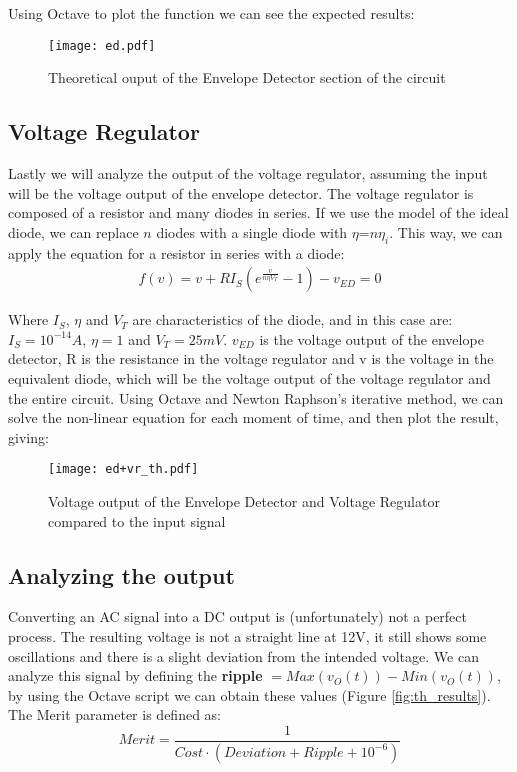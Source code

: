 Using Octave to plot the function we can see the expected results:

\begin{figure}[h]
	\centering
	\texttt{[image: ed.pdf]}
	\caption{Theoretical ouput of the Envelope Detector section of the circuit}
	\label{fig:envelope}
\end{figure}

\newpage

\subsection{Voltage Regulator}
\hspace{12pt} Lastly we will analyze the output of the voltage regulator, assuming the input will be the voltage output of the envelope detector. The voltage regulator is composed of a resistor and many diodes in series. If we use the model of the ideal diode, we can replace $n$ diodes with a single diode with $\eta$=$n\eta _i$. This way, we can apply the equation for a resistor in series with a diode:
\vspace{-8pt}
\begin{gather}
    f(v)=v+RI_S(e^{\frac{v}{n \eta V_T}}-1)-v_{ED}=0 \nonumber
\end{gather}

Where $I_S$, $\eta$ and $V_T$ are characteristics of the diode, and in this case are: $I_S = 10^{-14}A$, $\eta = 1$ and $V_T = 25mV$. $v_{ED}$ is the voltage output of the envelope detector, R is the resistance in the voltage regulator and v is the voltage in the equivalent diode, which will be the voltage output of the voltage regulator and the entire circuit.
Using Octave and Newton Raphson's iterative method, we can solve the non-linear equation for each moment of time, and then plot the result, giving:

\begin{figure}[h]
	\centering
	\texttt{[image: ed+vr\_th.pdf]}
	\caption{Voltage output of the Envelope Detector and Voltage Regulator compared to the input signal}
	\label{fig:regulator}
\end{figure}

\subsection{Analyzing the output}
\hspace{12pt} Converting an AC signal into a DC output is (unfortunately) not a perfect process. The resulting voltage is not a straight line at 12V, it still shows some oscillations and there is a slight deviation from the intended voltage. We can analyze this signal by defining the \textbf{ripple} $= Max(v_O(t)) - Min(v_O(t))$, by using the Octave script we can obtain these values (Figure \ref{fig:th_results}). The Merit parameter is defined as:
\begin{equation}
	Merit = \frac{1}{Cost \cdot(Deviation + Ripple + 10^{-6})}
\end{equation}

